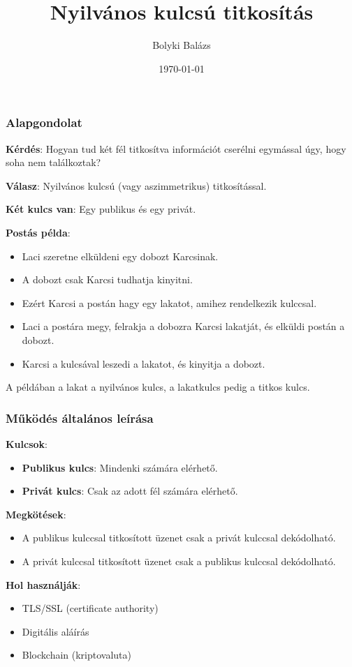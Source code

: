 \documentclass{beamer}
\title{Nyilvános kulcsú titkosítás}
\author{Bolyki Balázs}
\institute{Miskolci Egyetem}
\date{\today}
\begin{document}
\titlepage

\begin{frame}
    \frametitle{Alapgondolat}
    \textbf{Kérdés}: Hogyan tud két fél titkosítva információt cserélni egymással úgy, hogy soha nem találkoztak?

    \textbf{Válasz}: Nyilvános kulcsú (vagy aszimmetrikus) titkosítással.

    \textbf{Két kulcs van}: Egy publikus és egy privát.

    \textbf{Postás példa}:

    \begin{itemize}
        \item Laci szeretne elküldeni egy dobozt Karcsinak.
        \item A dobozt csak Karcsi tudhatja kinyitni.
        \item Ezért Karcsi a postán hagy egy lakatot, amihez rendelkezik kulccsal.
        \item Laci a postára megy, felrakja a dobozra Karcsi lakatját, és elküldi postán a dobozt.
        \item Karcsi a kulcsával leszedi a lakatot, és kinyitja a dobozt.
    \end{itemize}

    A példában a lakat a nyilvános kulcs, a lakatkulcs pedig a titkos kulcs.

\end{frame}

\begin{frame}
    \frametitle{Működés általános leírása}

    \textbf{Kulcsok}:
    \begin{itemize}
        \item \textbf{Publikus kulcs}: Mindenki számára elérhető.
        \item \textbf{Privát kulcs}: Csak az adott fél számára elérhető.
    \end{itemize}
    \textbf{Megkötések}:
    \begin{itemize}
        \item A publikus kulccsal titkosított üzenet csak a privát kulccsal dekódolható.
        \item A privát kulccsal titkosított üzenet csak a publikus kulccsal dekódolható.
    \end{itemize}

    \textbf{Hol használják}:
    \begin{itemize}
        \item TLS/SSL (certificate authority)
        \item Digitális aláírás
        \item Blockchain (kriptovaluta)
    \end{itemize}
\end{frame}
\end{document}
